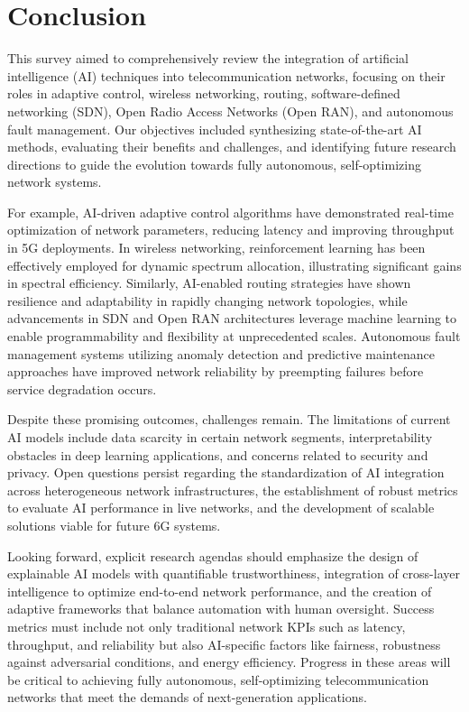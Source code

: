 \documentclass[sigconf]{acmart}
\begin{document}
\section{Conclusion}

This survey aimed to comprehensively review the integration of artificial intelligence (AI) techniques into telecommunication networks, focusing on their roles in adaptive control, wireless networking, routing, software-defined networking (SDN), Open Radio Access Networks (Open RAN), and autonomous fault management. Our objectives included synthesizing state-of-the-art AI methods, evaluating their benefits and challenges, and identifying future research directions to guide the evolution towards fully autonomous, self-optimizing network systems.

For example, AI-driven adaptive control algorithms have demonstrated real-time optimization of network parameters, reducing latency and improving throughput in 5G deployments. In wireless networking, reinforcement learning has been effectively employed for dynamic spectrum allocation, illustrating significant gains in spectral efficiency. Similarly, AI-enabled routing strategies have shown resilience and adaptability in rapidly changing network topologies, while advancements in SDN and Open RAN architectures leverage machine learning to enable programmability and flexibility at unprecedented scales. Autonomous fault management systems utilizing anomaly detection and predictive maintenance approaches have improved network reliability by preempting failures before service degradation occurs.

Despite these promising outcomes, challenges remain. The limitations of current AI models include data scarcity in certain network segments, interpretability obstacles in deep learning applications, and concerns related to security and privacy. Open questions persist regarding the standardization of AI integration across heterogeneous network infrastructures, the establishment of robust metrics to evaluate AI performance in live networks, and the development of scalable solutions viable for future 6G systems.

Looking forward, explicit research agendas should emphasize the design of explainable AI models with quantifiable trustworthiness, integration of cross-layer intelligence to optimize end-to-end network performance, and the creation of adaptive frameworks that balance automation with human oversight. Success metrics must include not only traditional network KPIs such as latency, throughput, and reliability but also AI-specific factors like fairness, robustness against adversarial conditions, and energy efficiency. Progress in these areas will be critical to achieving fully autonomous, self-optimizing telecommunication networks that meet the demands of next-generation applications.
\end{document}
